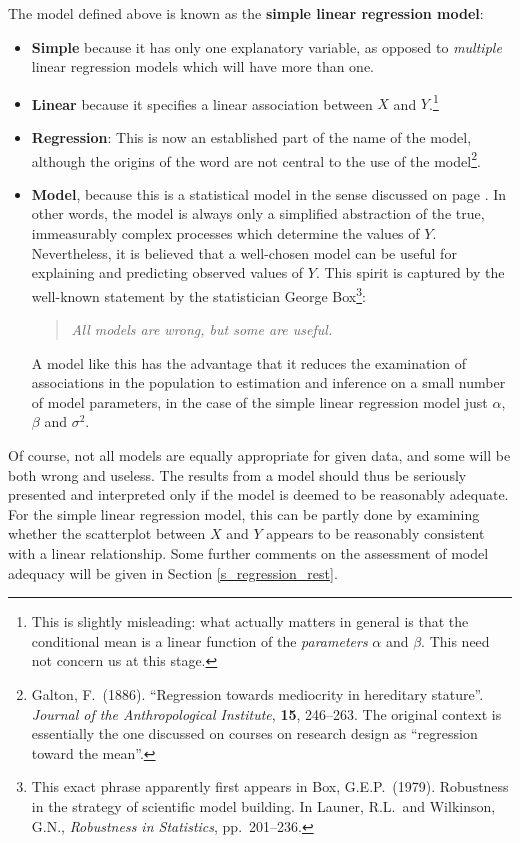 The model defined above is known as the \textbf{simple linear regression
model}:
\begin{itemize}
\item
\textbf{Simple} because it has only one explanatory variable, as
opposed to \emph{multiple} linear regression models
which will have more than one.
\item
\textbf{Linear} because it specifies a linear
association between $X$ and $Y$.\footnote{This is slightly misleading: what actually matters in general
is that the conditional mean is a linear function of the
\emph{parameters} $\alpha$ and $\beta$. This need not concern us at this
stage.}
\item
\textbf{Regression}: This is now an established part of the name
of the model, although the origins of the word
are not central to the use of the model\footnote{Galton, F.\ (1886). ``Regression towards mediocrity in
hereditary stature''. \emph{Journal of the Anthropological Institute},
\textbf{15}, 246--263. The original context is essentially the
one discussed on courses on research
design as ``regression toward the mean''.}.
\item
\textbf{Model}, because this is a statistical model in the sense
discussed on page \pageref{p_model}. In other
words, the model is always only a simplified abstraction of the true,
immeasurably complex processes which determine the values of $Y$.
Nevertheless, it is believed that a well-chosen model can be useful for
explaining and predicting observed values of $Y$. This spirit is
captured by the well-known statement by
the statistician George Box\footnote{This exact phrase apparently first
appears in Box, G.E.P.\ (1979). Robustness in the strategy of scientific
model building. In Launer, R.L.\ and Wilkinson, G.N., \emph{Robustness
in Statistics}, pp.\ 201--236.}:
\begin{quote}
\emph{All models are wrong, but some are useful.}
\end{quote}
A model like this has the advantage that it reduces the examination of
associations in the population to estimation and inference on a small
number of model parameters, in the case of the
simple linear regression model just $\alpha$, $\beta$ and $\sigma^{2}$.
\end{itemize}
Of course, not all models are equally appropriate for given data, and
some will be both wrong and useless. The results from a model should
thus be seriously presented and interpreted only if the model is deemed
to be reasonably adequate. For the simple linear regression model, this
can be partly done by examining whether the scatterplot between $X$ and
$Y$ appears to be reasonably consistent with a linear relationship. Some
further comments on the assessment of model adequacy will be given in
Section \ref{s_regression_rest}.

